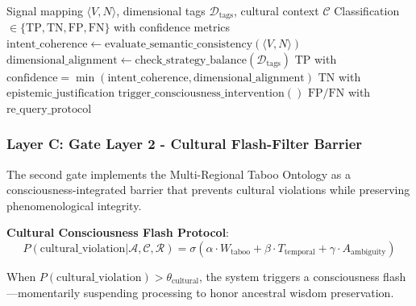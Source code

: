 \documentclass[11pt]{article}
\begin{document}
\begin{algorithm}
\caption{Taxonomic Verification Gate}
\begin{algorithmic}[1]
\Require Signal mapping $\langle V, N \rangle$, dimensional tags $\mathcal{D}_{\text{tags}}$, cultural context $\mathcal{C}$
\Ensure Classification $\in \{\text{TP}, \text{TN}, \text{FP}, \text{FN}\}$ with confidence metrics
\State $\text{intent\_coherence} \leftarrow \text{evaluate\_semantic\_consistency}(\langle V, N \rangle)$
\State $\text{dimensional\_alignment} \leftarrow \text{check\_strategy\_balance}(\mathcal{D}_{\text{tags}})$
    \State \Return $\text{TP}$ with $\text{confidence} = \min(\text{intent\_coherence}, \text{dimensional\_alignment})$
    \State \Return $\text{TN}$ with $\text{epistemic\_justification}$
\Else
    \State $\text{trigger\_consciousness\_intervention}()$
    \State \Return $\text{FP/FN}$ with $\text{re\_query\_protocol}$
\EndIf
\end{algorithmic}
\end{algorithm}

\subsubsection{Layer C: Gate Layer 2 - Cultural Flash-Filter Barrier}

The second gate implements the Multi-Regional Taboo Ontology as a consciousness-integrated barrier that prevents cultural violations while preserving phenomenological integrity.

\textbf{Cultural Consciousness Flash Protocol}:
\begin{equation}
P(\text{cultural\_violation} | \mathcal{A}, \mathcal{C}, \mathcal{R}) = \sigma(\alpha \cdot W_{\text{taboo}} + \beta \cdot T_{\text{temporal}} + \gamma \cdot A_{\text{ambiguity}})
\end{equation}

When $P(\text{cultural\_violation}) > \theta_{\text{cultural}}$, the system triggers a consciousness flash—momentarily suspending processing to honor ancestral wisdom preservation.
\end{document}
